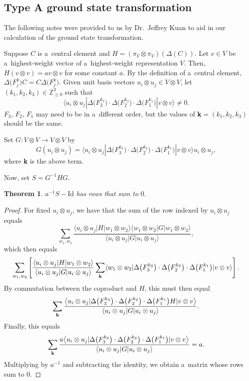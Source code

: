 \documentclass[pdftex]{sigma}
\numberwithin{equation}{section}
\newtheorem{Theorem}{Theorem}[section]
\theoremstyle{definition}
\begin{document}
\subsection[Type A ground state transformation]{Type A ground state transformation} \label{subsection-groundstatetransformation}
The following notes were provided to us by Dr.~Jeffrey Kuan to aid in our calculation of the ground state transformation.

Suppose $C$ is a~central element and $H= (\pi_V \otimes \pi_V) (\Delta (C))$. Let $v \in V$ be a~highest-weight vector of a~highest-weight representation $V$. Then,
$H(v \otimes v) = av\otimes v$
for some constant $a$. By the definition of a~central element,
$\Delta\bigl(F_j^k\bigr) C = C \Delta\bigl(F_j^k\bigr)$.
Given unit basis vectors $u_i \otimes u_j \in V \otimes V$, let $(k_1, k_2, k_3) \in \mathbb{Z}_{\geq 0}^3$ such that
\[
\bigl\langle u_i \otimes u_j|\Delta\bigl(F_3^{k_3}\bigr) \cdot \Delta\bigl(F_2^{k_2}\bigr) \cdot \Delta\bigl(F_1^{k_1}\bigr) | v \otimes v \bigr\rangle \neq 0.
\]
$F_3$, $F_2$, $F_1$ may need to be in a~different order, but the values of \textbf{k}$= (k_1, k_2, k_3)$ should be the same.

Set $G\colon V \otimes V \to V \otimes V$ by
\[G(u_i \otimes u_j) =\bigl\langle u_i \otimes u_j | \Delta\bigl(F_3^{k_3}\bigr) \cdot \Delta\bigl(F_2^{k_2}\bigr) \cdot \Delta\bigl(F_1^{k_1}\bigr) | v \otimes v \bigr\rangle u_i \otimes u_j,
 \]
where \textbf{k} is the above term.

Now, set $S = G^{-1}HG$.
\begin{Theorem}
 $a^{-1}S-\mathrm{Id}$ has rows that sum to $0$.
\end{Theorem}
\begin{proof}
 For fixed $u_i \otimes u_j$, we have that the sum of the row indexed by $u_i \otimes u_j$ equals
 \[
 \sum_{w_1,w_2} \frac{\langle u_i \otimes u_j | H | w_1 \otimes w_2 \rangle \langle w_1 \otimes w_2 | G | w_1 \otimes w_2 \rangle}{\langle u_i \otimes u_j | G | u_i \otimes u_j \rangle},
 \]
 which then equals
 \[
 \sum_{w_1,w_2} \left[ \frac{\langle u_i \otimes u_j | H | w_1 \otimes w_2 \rangle }{\langle u_i \otimes u_j | G | u_i \otimes u_j \rangle} \sum_{\text{\textbf{k}}} \langle w_1 \otimes w_2 | \Delta\bigl(F_3^{k_3}\bigr) \cdot \Delta\bigl(F_2^{k_2}\bigr) \cdot \Delta\bigl(F_1^{k_1}\bigr) | v \otimes v \rangle \right].\]
 By commutation between the coproduct and $H$, this must then equal
 \[
 \sum_{\text{\textbf{k}}} \frac{\bigl\langle u_i \otimes u_j | \Delta\bigl(F_3^{k_3}\bigr) \cdot \Delta\bigl(F_2^{k_2}\bigr) \cdot \Delta\bigl(F_1^{k_1}\bigr)H | v \otimes v \bigr\rangle}{\langle u_i \otimes u_j | G | u_i \otimes u_j \rangle}.
 \]
 Finally, this equals
 \[
 \sum_{\text{\textbf{k}}} \frac{a\bigl\langle u_i \otimes u_j | \Delta\bigl(F_3^{k_3}\bigr) \cdot \Delta\bigl(F_2^{k_2}\bigr) \cdot \Delta\bigl(F_1^{k_1}\bigr) | v \otimes v \bigr\rangle}{\langle u_i \otimes u_j | G | u_i \otimes u_j \rangle} = a.
 \]
 Multiplying by $a^{-1}$ and subtracting the identity, we obtain a~matrix whose rows sum to $0$.
\end{proof}
\end{document}
